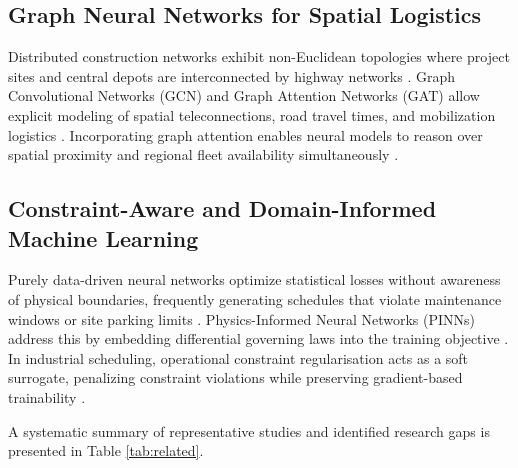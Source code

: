 \documentclass[11pt,a4paper]{article}
\begin{document}
\subsection{Graph Neural Networks for Spatial Logistics}
Distributed construction networks exhibit non-Euclidean topologies where project sites and central depots are interconnected by highway networks \cite{hussain2023}. Graph Convolutional Networks (GCN) and Graph Attention Networks (GAT) allow explicit modeling of spatial teleconnections, road travel times, and mobilization logistics \cite{liu2025,yadav2025}. Incorporating graph attention enables neural models to reason over spatial proximity and regional fleet availability simultaneously \cite{tao2025}.

\subsection{Constraint-Aware and Domain-Informed Machine Learning}
Purely data-driven neural networks optimize statistical losses without awareness of physical boundaries, frequently generating schedules that violate maintenance windows or site parking limits \cite{meng2025,cuomo2022}. Physics-Informed Neural Networks (PINNs) address this by embedding differential governing laws into the training objective \cite{cuomo2022}. In industrial scheduling, operational constraint regularisation acts as a soft surrogate, penalizing constraint violations while preserving gradient-based trainability \cite{wang2025}.

A systematic summary of representative studies and identified research gaps is presented in Table \ref{tab:related}.
\end{document}
